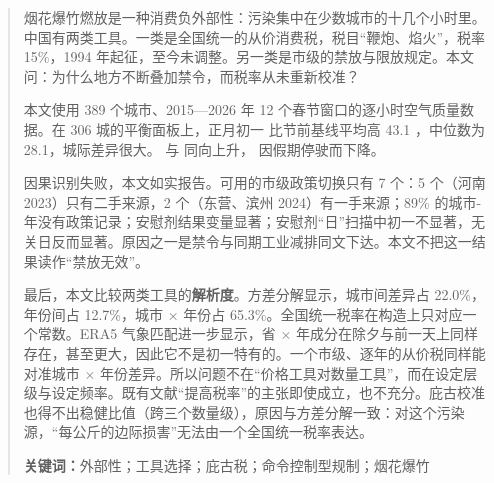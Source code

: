 \begin{abstract}
\noindent
烟花爆竹燃放是一种消费负外部性：污染集中在少数城市的十几个小时里。中国有两类工具。一类是全国统一的从价消费税，税目“鞭炮、焰火”，税率 15\%，1994 年起征，至今未调整。另一类是市级的禁放与限放规定。本文问：为什么地方不断叠加禁令，而税率从未重新校准？

本文使用 389 个城市、2015—2026 年 12 个春节窗口的逐小时空气质量数据。在 306 城的平衡面板上，正月初一  比节前基线平均高 43.1 \ugm，中位数为 28.1，城际差异很大。\SOtwo{} 与  同向上升，\NOtwo{} 因假期停驶而下降。

因果识别失败，本文如实报告。可用的市级政策切换只有 7 个：5 个（河南 2023）只有二手来源，2 个（东营、滨州 2024）有一手来源；89\% 的城市-年没有政策记录；安慰剂结果变量显著；安慰剂“日”扫描中初一不显著，无关日反而显著。原因之一是禁令与同期工业减排同文下达。本文不把这一结果读作“禁放无效”。

最后，本文比较两类工具的\textbf{解析度}。方差分解显示，城市间差异占 22.0\%，年份间占 12.7\%，城市 $\times$ 年份占 65.3\%。全国统一税率在构造上只对应一个常数。ERA5 气象匹配进一步显示，省 $\times$ 年成分在除夕与前一天上同样存在，甚至更大，因此它不是初一特有的。一个市级、逐年的从价税同样能对准城市 $\times$ 年份差异。所以问题不在“价格工具对数量工具”，而在设定层级与设定频率。既有文献“提高税率”的主张即使成立，也不充分。庇古校准也得不出稳健比值（跨三个数量级），原因与方差分解一致：对这个污染源，“每公斤的边际损害”无法由一个全国统一税率表达。

\vspace{0.8em}
\noindent\textbf{关键词：}外部性；工具选择；庇古税；命令控制型规制；烟花爆竹
\end{abstract}

\clearpage
